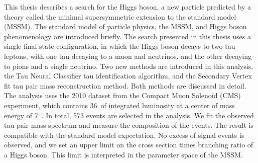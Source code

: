 This thesis describes a search for the Higgs boson, a new particle predicted by
a theory called the minimal supersymmetric extension to the standard model
(MSSM).  The standard model of particle physics, the MSSM, and Higgs boson
phenomenology are introduced briefly. The search presented in this thesis uses a
single final state configuration, in which the Higgs boson decays to two tau
leptons, with one tau decaying to a muon and neutrinos,  and the other decaying to
pions and a single neutrino.  Two new methods are introduced in this analysis,
the Tau Neural Classifier tau identification algorithm, and the Secondary Vertex
fit tau pair mass reconstruction method.  Both methods are discussed in detail.
The analysis uses the 2010 dataset from the Compact Muon Solenoid (CMS)
experiment, which contains 36~\pbinv of integrated luminosity at a center of
mass energy of 7~\TeV.  In total, 573 events are selected in the analysis.  We
fit the observed tau pair mass spectrum and measure the composition of the
events. The result is compatible with the standard model expectation.  No excess
of signal events is observed, and we set an upper limit on the cross section times
branching ratio of a Higgs boson.  This limit is interpreted in the parameter
space of the MSSM.
